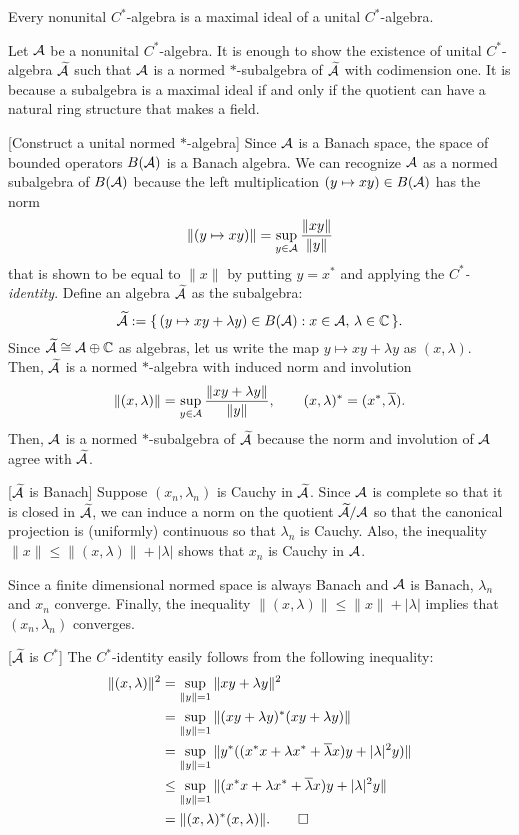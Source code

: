 \documentclass{../exp}
\begin{document}
\begin{thm*}
Every nonunital $C^*$-algebra is a maximal ideal of a unital $C^*$-algebra.
\end{thm*}
\begin{pf}
Let $\mathcal{A}$ be a nonunital $C^*$-algebra.
It is enough to show the existence of unital $C^*$-algebra $\widetilde{\mathcal{A}}$ such that $\mathcal{A}$ is a normed $*$-subalgebra of $\widetilde{\mathcal{A}}$ with codimension one.
It is because a subalgebra is a maximal ideal if and only if the quotient can have a natural ring structure that makes a field.

[Construct a unital normed $*$-algebra]
Since $\mathcal{A}$ is a Banach space, the space of bounded operators $B(\mathcal{A})$ is a Banach algebra.
We can recognize $\mathcal{A}$ as a normed subalgebra of $B(\mathcal{A})$ because the left multiplication $(y\mapsto xy)\in B(\mathcal{A})$ has the norm
\[\|(y\mapsto xy)\|=\sup_{y\in\mathcal{A}}\frac{\|xy\|}{\|y\|}\]
that is shown to be equal to $\|x\|$ by putting $y=x^*$ and applying the \emph{$C^*$-identity}.
Define an algebra $\widetilde{\mathcal{A}}$ as the subalgebra:
\[\widetilde{\mathcal{A}}:=\{\,(y\mapsto xy+\lambda y)\in B(\mathcal{A}):x\in\mathcal{A},\,\lambda\in\mathbb{C}\,\}.\]
Since $\widetilde{\mathcal{A}}\cong\mathcal{A}\oplus\mathbb{C}$ as algebras, let us write the map $y\mapsto xy+\lambda y$ as $(x,\lambda)$.
Then, $\widetilde{\mathcal{A}}$ is a normed $*$-algebra with induced norm and involution
\[\|(x,\lambda)\|=\sup_{y\in\mathcal{A}}\frac{\|xy+\lambda y\|}{\|y\|},\qquad(x,\lambda)^*=(x^*,\overline{\lambda}).\]
Then, $\mathcal{A}$ is a normed $*$-subalgebra of $\widetilde{\mathcal{A}}$ because the norm and involution of $\mathcal{A}$ agree with $\widetilde{\mathcal{A}}$.

[$\widetilde{\mathcal{A}}$ is Banach]
Suppose $(x_n,\lambda_n)$ is Cauchy in $\widetilde{\mathcal{A}}$.
Since $\mathcal{A}$ is complete so that it is closed in $\widetilde{\mathcal{A}}$, we can induce a norm on the quotient $\widetilde{\mathcal{A}}/\mathcal{A}$ so that the canonical projection is (uniformly) continuous so that $\lambda_n$ is Cauchy.
Also, the inequality $\|x\|\le\|(x,\lambda)\|+|\lambda|$ shows that $x_n$ is Cauchy in $\mathcal{A}$.

Since a finite dimensional normed space is always Banach and $\mathcal{A}$ is Banach, $\lambda_n$ and $x_n$ converge.
Finally, the inequality $\|(x,\lambda)\|\le\|x\|+|\lambda|$ implies that $(x_n,\lambda_n)$ converges.

[$\widetilde{\mathcal{A}}$ is $C^*$]
The $C^*$-identity easily follows from the following inequality:
\begin{align*}
\|(x,\lambda)\|^2&=\sup_{\|y\|=1}\|xy+\lambda y\|^2\\
&=\sup_{\|y\|=1}\|(xy+\lambda y)^*(xy+\lambda y)\|\\
&=\sup_{\|y\|=1}\|y^*((x^*x+\lambda x^*+\overline\lambda x)y+|\lambda|^2y)\|\\
&\le\sup_{\|y\|=1}\|(x^*x+\lambda x^*+\overline\lambda x)y+|\lambda|^2y\|\\
&=\|(x,\lambda)^*(x,\lambda)\|.\qedhere
\end{align*}
\end{pf}
\end{document}
